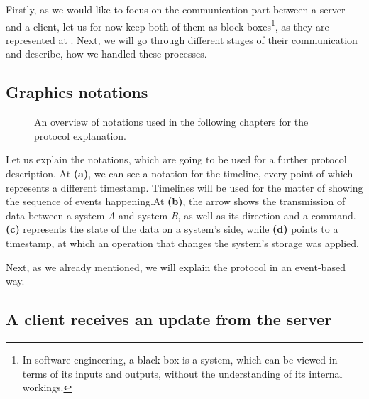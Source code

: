 Firstly, as we would like to focus on the communication part between a server and a client, let us for now keep both of them as block boxes\footnote{In software engineering, a black box is a system, which can be viewed in terms of its inputs and outputs, without the understanding of its internal workings.\cite{49}}, as they are represented at . Next, we will go through different stages of their communication and describe, how we handled these processes. 

\subsection*{Graphics notations}

\begin{figure}[!htb]
    \centering
    \def\svgwidth{0.35\linewidth}
    \subfloat[]{{}}%
    \qquad
    \def\svgwidth{0.35\linewidth}
    \subfloat[]{{}}%
 \def\svgwidth{0.35\linewidth}
    \subfloat[]{{}}%
    \qquad
 \def\svgwidth{0.35\linewidth}
    \subfloat[]{{}}%
    \qquad
    \caption{An overview of notations used in the following chapters for the protocol explanation.}%
    \label{fig:notations}%
\end{figure}

Let us explain the notations, which are going to be used for a further protocol description. At  \textbf{(a)}, we can see a notation for the timeline, every point of which represents a different timestamp. Timelines will be used for the matter of showing the sequence of events happening.At  \textbf{(b)}, the arrow shows the transmission of data between a system \textit{A} and system \textit{B}, as well as its direction and a command.  \textbf{(c)} represents the state of the data on a system's side, while  \textbf{(d)} points to a timestamp, at which an operation that changes the system's storage was applied.

Next, as we already mentioned, we will explain the protocol in an event-based way. 

\subsection*{A client receives an update from the server}

